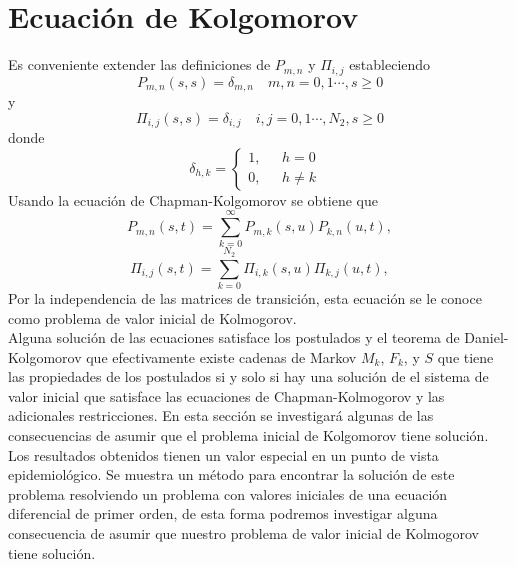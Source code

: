 \section{Ecuación de Kolgomorov}
Es conveniente extender las definiciones de $P_{m,n}$ y $\Pi_{i,j}$ estableciendo $$P_{m,n}(s,s)=\delta_{m,n}\quad m,n=0,1\cdots, s\geq 0$$
y
$$\Pi_{i,j}(s,s)=\delta_{i,j}\quad i,j=0,1\cdots,N_2, s\geq 0$$
donde 
$$\delta_{h,k}=
    \begin{cases}
    1, & \mbox{ $h=0$ } \\
    0, & \mbox{ $h\not=k$}
    \end{cases}$$
Usando la ecuación de Chapman-Kolgomorov se obtiene que
$$P_{m,n}(s,t)=\sum_{k=0}^\infty P_{m,k}(s,u)P_{k,n}(u,t),$$
$$\Pi_{i,j}(s,t)=\sum_{k=0}^{N_2} \Pi_{i,k}(s,u)\Pi_{k,j}(u,t),$$
Por la independencia de las matrices de transición, esta ecuación se le conoce como problema de valor inicial de Kolmogorov.\\ Alguna solución de las ecuaciones satisface los postulados y el teorema de Daniel-Kolgomorov que efectivamente existe cadenas de Markov $M_k$, $F_k$, y $S$ que tiene las propiedades de los postulados si y solo si hay una solución de el sistema de valor inicial que satisface las ecuaciones de Chapman-Kolmogorov y las adicionales restricciones.
En esta sección se investigará algunas de las consecuencias de asumir que el problema inicial de Kolgomorov tiene solución. Los resultados obtenidos tienen un valor especial en un punto de vista epidemiológico. Se muestra un método para encontrar la solución de este problema resolviendo un problema con valores iniciales de una ecuación diferencial de primer orden, de esta forma podremos investigar alguna consecuencia de asumir que nuestro problema de valor inicial de Kolmogorov tiene solución.

